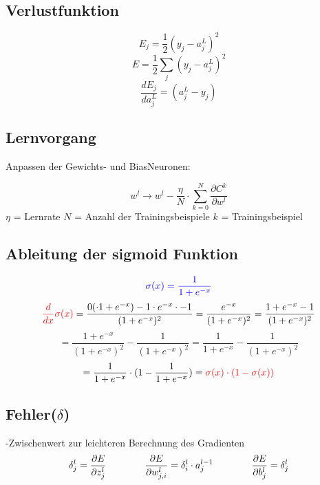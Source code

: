 \documentclass{article}
\begin{document}
\subsection{Verlustfunktion}
\[ E_j = \frac{1}{2}(y_j - a_j^L)^2 \]
\[ E = \frac{1}{2}\sum_{j}^{} (y_j - a_j^L)^2 \]
\[ \frac{dE_j}{da_{j}^L}  = (a_j^L - y_j) \]


\subsection{Lernvorgang}
Anpassen der Gewichts- und BiasNeuronen:

\[ w^l \rightarrow w^l - \frac{\eta}{N} \cdot \sum_{k = 0}^{N} \frac{\partial C^k}{\partial w^l} \]
$\eta$ = Lernrate \kern 20pt $N$ = Anzahl der Trainingsbeispiele \kern 20pt $k$ = Trainingsbeispiel 


\subsection{Ableitung der sigmoid Funktion}
\[ \textcolor{blue}{ \sigma(x) = \frac{1}{1 + e^{-x}} } \]
\[ \textcolor{red}{ \frac{d}{dx}\sigma(x) } = \frac{
0( \cdot 1 + e^{-x}) - 1 \cdot e^{-x} \cdot -1
}{
    (1 + e^{-x})^2
} = \frac{e^{-x}}{(1 + e^{-x})^2} 
= \frac{1 + e^{-x} - 1}{(1 + e^{-x})^2} \]
\[ =\frac{1 + e^{-x}}{(1 + e^{-x})^2} - \frac{1}{(1 + e^{-x})^2} 
= \frac{1}{1 + e^{-x}} - \frac{1}{(1 + e^{-x})^2} \]
\[ = \frac{1}{1 + e^{-x}} \cdot (1 - \frac{1}{1 + e^{-x}}) 
= \textcolor{red}{ \sigma(x) \cdot (1 - \sigma(x)) } \]



\subsection{Fehler($\delta$)}
-Zwischenwert zur leichteren Berechnung des Gradienten
\[ \delta_j^l = \frac{\partial E}{\partial z_j^l} 
\kern 40pt
 \frac{\partial E}{\partial w_{j,i}^l} = \delta_i^l \cdot a_j^{l-1}
\kern 40pt
\frac{\partial E}{\partial b_j^l} = \delta_j^l \]
\end{document}
